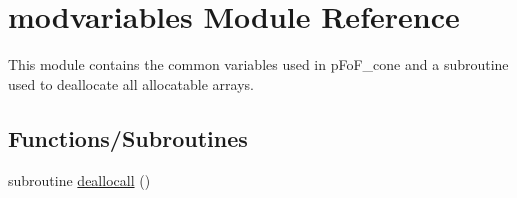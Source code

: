 \hypertarget{namespacemodvariables}{}\section{modvariables Module Reference}
\label{namespacemodvariables}


This module contains the common variables used in p\+Fo\+F\+\_\+cone and a subroutine used to deallocate all allocatable arrays.  


\subsection*{Functions/\+Subroutines}
\begin{DoxyCompactItemize}
\item 
subroutine \hyperlink{namespacemodvariables_a1b90ef0a0d8979fdfc0a578bbd2f3e17}{deallocall} ()
\end{DoxyCompactItemize}
